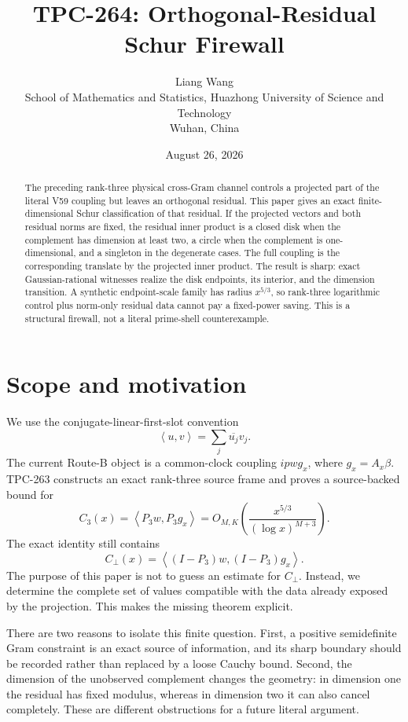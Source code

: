 \documentclass[11pt]{article}
\title{TPC-264: Orthogonal-Residual Schur Firewall}
\author{Liang Wang\\
School of Mathematics and Statistics, Huazhong University of Science and Technology\\
Wuhan, China}
\date{August 26, 2026}
\theoremstyle{definition}
\newcommand{\ip}[2]{\left\langle #1,#2\right\rangle}
\begin{document}
\maketitle

\begin{abstract}
The preceding rank-three physical cross-Gram channel controls a projected part
of the literal V59 coupling but leaves an orthogonal residual.  This paper gives
an exact finite-dimensional Schur classification of that residual.  If the
projected vectors and both residual norms are fixed, the residual inner product
is a closed disk when the complement has dimension at least two, a circle when
the complement is one-dimensional, and a singleton in the degenerate cases.
The full coupling is the corresponding translate by the projected inner
product.  The result is sharp: exact Gaussian-rational witnesses realize the
disk endpoints, its interior, and the dimension transition.  A synthetic
endpoint-scale family has radius $x^{5/3}$, so rank-three logarithmic control
plus norm-only residual data cannot pay a fixed-power saving.  This is a
structural firewall, not a literal prime-shell counterexample.
\end{abstract}

\section{Scope and motivation}

We use the conjugate-linear-first-slot convention
\[
 \ip{u}{v}=\sum_j\overline{u_j}v_j.
\]
The current Route-B object is a common-clock coupling
\(ip{w}{g_x}\), where $g_x=A_x\beta$.  TPC-263 constructs an exact
rank-three source frame and proves a source-backed bound for
\[
 C_3(x)=\ip{P_3w}{P_3g_x}
       =O_{M,K}\!\left(\frac{x^{5/3}}{(\log x)^{M+3}}\right).
\]
The exact identity still contains
\[
 C_\perp(x)=\ip{(I-P_3)w}{(I-P_3)g_x}.
\]
The purpose of this paper is not to guess an estimate for $C_\perp$.
Instead, we determine the complete set of values compatible with the data
already exposed by the projection.  This makes the missing theorem explicit.

There are two reasons to isolate this finite question.  First, a positive
semidefinite Gram constraint is an exact source of information, and its sharp
boundary should be recorded rather than replaced by a loose Cauchy bound.
Second, the dimension of the unobserved complement changes the geometry: in
dimension one the residual has fixed modulus, whereas in dimension two it can
also cancel completely.  These are different obstructions for a future literal
argument.
\end{document}
